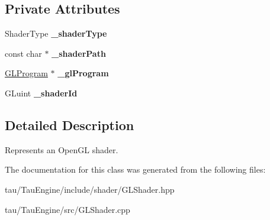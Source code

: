\subsection*{Private Attributes}
\begin{DoxyCompactItemize}
\item 
\mbox{\label{class_g_l_shader_ade645efccab5c92733f0238240639544}} 
Shader\+Type {\bfseries \+\_\+shader\+Type}
\item 
\mbox{\label{class_g_l_shader_a93a52afc055c6497c2029ac7793d611f}} 
const char $\ast$ {\bfseries \+\_\+shader\+Path}
\item 
\mbox{\label{class_g_l_shader_a3c8a2c7a3753ede2c60ad537989715d4}} 
\mbox{\hyperlink{class_g_l_program}{G\+L\+Program}} $\ast$ {\bfseries \+\_\+gl\+Program}
\item 
\mbox{\label{class_g_l_shader_a98c823944de9e8446adb82701420aa5c}} 
G\+Luint {\bfseries \+\_\+shader\+Id}
\end{DoxyCompactItemize}


\subsection{Detailed Description}
Represents an Open\+GL shader. 

The documentation for this class was generated from the following files\+:\begin{DoxyCompactItemize}
\item 
tau/\+Tau\+Engine/include/shader/G\+L\+Shader.\+hpp\item 
tau/\+Tau\+Engine/src/G\+L\+Shader.\+cpp\end{DoxyCompactItemize}
